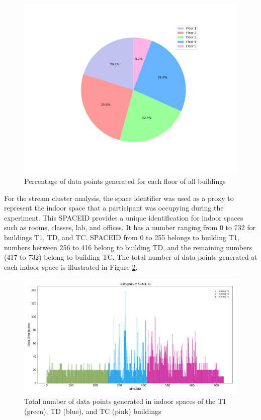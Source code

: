 \begin{figure}[!ht]
    \centering
    \includegraphics[width = 12 cm]{image/Chapters/Chapter6/floors.png}
    \caption{Percentage of data points generated for each floor of all buildings}
    \label{Pfloor}
\end{figure} 

For the stream cluster analysis, the space identifier was used as a proxy to represent the indoor space that a participant was occupying during the experiment. This SPACEID provides a unique identification for indoor spaces such as rooms, classes, lab, and offices. It has a number ranging from 0 to 732 for  buildings T1, TD, and TC. SPACEID from 0 to 255 belongs to building T1, numbers between 256 to 416 belong to building TD, and the remaining numbers (417 to 732) belong to building TC. The total number of data points generated at each indoor space is illustrated in Figure \ref{spaceiduniq }. 

\begin{figure}[ht]
    \centering
    \includegraphics[width = 16 cm]{image/Chapters/Chapter6/uniqspaceid.png}
    \caption{ Total number of data points generated in indoor spaces of the T1 (green), TD (blue), and TC (pink) buildings}
    \label{spaceiduniq }
\end{figure}

